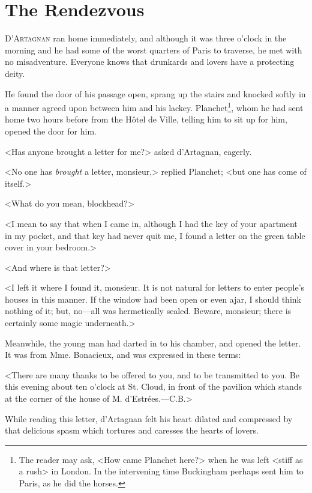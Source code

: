 
\chapter{The Rendezvous} 
	
\lettrine[]{D}{'Artagnan} ran home immediately, and although it was three o'clock in the morning and he had some of the worst quarters of Paris to traverse, he met with no misadventure. Everyone knows that drunkards and lovers have a protecting deity. 

He found the door of his passage open, sprang up the stairs and knocked softly in a manner agreed upon between him and his lackey. Planchet\footnote{The reader may ask, <How came Planchet here?> when he was left <stiff as a rush> in London. In the intervening time Buckingham perhaps sent him to Paris, as he did the horses.}, whom he had sent home two hours before from the Hôtel de Ville, telling him to sit up for him, opened the door for him. 

<Has anyone brought a letter for me?> asked d'Artagnan, eagerly. 

<No one has \textit{brought} a letter, monsieur,> replied Planchet; <but one has come of itself.> 

<What do you mean, blockhead?> 

<I mean to say that when I came in, although I had the key of your apartment in my pocket, and that key had never quit me, I found a letter on the green table cover in your bedroom.> 

<And where is that letter?> 

<I left it where I found it, monsieur. It is not natural for letters to enter people's houses in this manner. If the window had been open or even ajar, I should think nothing of it; but, no---all was hermetically sealed. Beware, monsieur; there is certainly some magic underneath.> 

Meanwhile, the young man had darted in to his chamber, and opened the letter. It was from Mme. Bonacieux, and was expressed in these terms: 

<There are many thanks to be offered to you, and to be transmitted to you. Be this evening about ten o'clock at St. Cloud, in front of the pavilion which stands at the corner of the house of M. d'Estrées.---C.B.> 

While reading this letter, d'Artagnan felt his heart dilated and compressed by that delicious spasm which tortures and caresses the hearts of lovers. 

